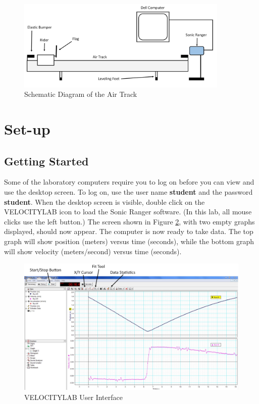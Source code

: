\begin{figure}[h]
    \begin{center}
        \includegraphics[width=0.9\textwidth]{./Exp2/pic/image11.jpg}
    \end{center}
    \caption{Schematic Diagram of the Air Track}
    \label{fig:airtrack}
\end{figure}

\section{Set-up}

\subsection{Getting Started}

Some of the laboratory computers require you to log on before you can view and use the desktop screen.  To log on, use the user name \textbf{student} and the password \textbf{student}.  When the desktop screen is visible, double click on the VELOCITYLAB icon to load the Sonic Ranger software.  (In this lab, all mouse clicks use the left button.)  The screen shown in Figure \ref{fig:velocitylab}, with two empty graphs displayed, should now appear.  The computer is now ready to take data.  The top graph will show position (meters) versus time (seconds), while the bottom graph will show velocity (meters/second) versus time (seconds).
\begin{figure}[h]
    \begin{center}
        \includegraphics[width=1.0\textwidth]{./Exp2/pic/image16.jpg}
    \end{center}
    \caption{VELOCITYLAB User Interface}
    \label{fig:velocitylab}
\end{figure}


